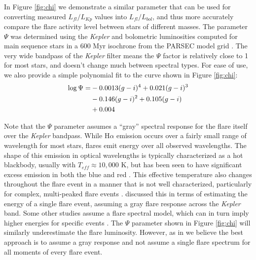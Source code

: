 \documentclass[preprint2]{aastex62}
\newcommand{\Kepler}{\textsl{Kepler}\xspace}
\begin{document}
In Figure \ref{fig:chi} we demonstrate a similar parameter that can be used for converting measured $L_{fl}/L_{Kp}$ values into $L_{fl}/L_{bol}$, and thus more accurately compare the flare activity level between stars of different masses. The parameter $\Psi$ was determined using the \Kepler and bolometric luminosities computed for main sequence stars in a 600 Myr isochrone from the PARSEC model grid \citet{bressan2012}. The very wide bandpass of the \Kepler filter means the $\Psi$ factor is relatively close to 1 for most stars, and doesn't change much between spectral types. For ease of use, we also provide a simple polynomial fit to the curve shown in Figure \ref{fig:chi}:
\begin{eqnarray}
\log \Psi =& -0.0013 (g-i)^4 + 0.021 (g-i)^3 \notag \\
& -0.146 (g-i)^2 + 0.105 (g-i) \notag \\ 
& + 0.004
\end{eqnarray}


Note that the $\Psi$ parameter assumes a ``gray'' spectral response for the flare itself over the \Kepler bandpass. While H$\alpha$ emission occurs over a fairly small range of wavelength for most stars, flares emit energy over all observed wavelengths. The shape of this emission in optical wavelengths is typically characterized as a hot blackbody, usually with $T_{eff}\approx10,000$ K, but has been seen to have significant excess emission in both the blue and red \citep[e.g. see][]{kowalski2013}. This effective temperature also changes throughout the flare event in a manner that is not well characterized, particularly for complex, multi-peaked flare events \citep[e.g.][]{slhadleo,kowalski2012}. \citet{davenport2016} discussed this in terms of estimating the energy of a single flare event, assuming a gray flare response across the \Kepler band. Some other studies assume a flare spectral model, which can in turn imply higher energies for specific events \citep[e.g.][]{gizis2013,maehara2015}. The $\Psi$ parameter shown in Figure \ref{fig:chi} will similarly underestimate the flare luminosity. However, as in \citet{davenport2016} we believe the best approach is to assume a gray response and not assume a single flare spectrum for all moments of every flare event.

\end{document}
